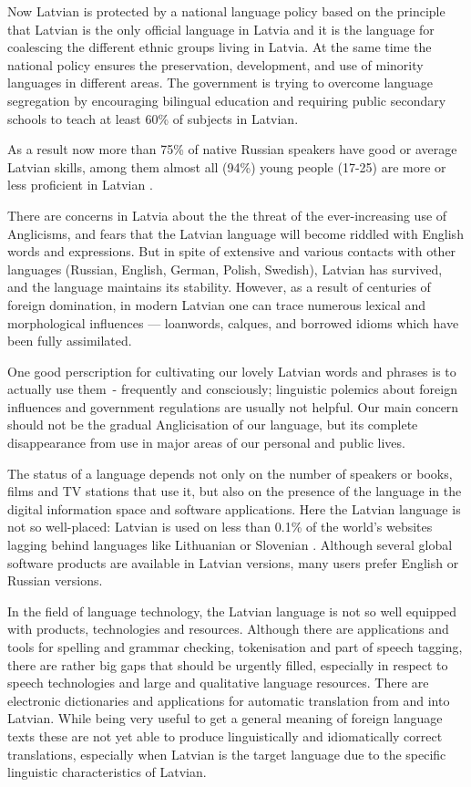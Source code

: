 \begin{multicols}{2}
Now Latvian is protected by a national language policy based on the principle that Latvian is the only official language in Latvia and it is the language for coalescing the  different ethnic groups living in Latvia.
At the same time the national policy ensures the preservation, development, and use of minority languages in different areas.
The government is trying to overcome language segregation by encouraging bilingual education and requiring public secondary schools to teach at least 60\% of subjects in Latvian. 

As a result now more than 75\% of native Russian speakers have good or average Latvian skills, among them almost all (94\%) young people (17-25) are more or less proficient in Latvian \cite{Meta3ES}. 

There are concerns in Latvia about the the threat of the ever-increasing use of Anglicisms, and fears that the Latvian language will become riddled with English words and expressions.
But in spite of extensive and various contacts with other languages (Russian, English, German, Polish, Swedish), Latvian has survived, and the language maintains its stability.
However, as a result of centuries of foreign domination, in modern Latvian one can trace numerous lexical and morphological influences — loanwords, calques, and borrowed idioms which have been fully assimilated. 

One good perscription for cultivating our lovely Latvian words and phrases is to actually use them~- frequently and consciously; linguistic polemics about foreign influences and government regulations are usually not helpful.
Our main concern should not be the gradual Anglicisation of our language, but its complete disappearance from use in major areas of our personal and public lives.
 
The status of a language depends not only on the number of speakers or books, films and TV stations that use it, but also on the presence of the language in the digital information space and software applications.
Here the Latvian language is not so well-placed: Latvian is used on less than 0.1\% of the world’s websites lagging behind languages like Lithuanian or Slovenian \cite{Meta4ES}.
Although several global software products are available in Latvian versions, many users prefer English or Russian versions.  

In the field of language technology, the Latvian language is not so well equipped with products, technologies and resources.
Although there are applications and tools for spelling and grammar checking, tokenisation and part of speech tagging, there are rather big gaps that should be urgently filled, especially in respect to speech technologies and large and qualitative language resources.
There are electronic dictionaries and applications for automatic translation from and into Latvian.
While being very useful to get a general meaning of foreign language texts these are not yet able to produce linguistically and idiomatically correct translations, especially when Latvian is the target language due to the specific linguistic characteristics of Latvian.


\end{multicols}
